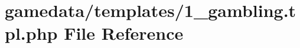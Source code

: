 \hypertarget{1__gambling_8tpl_8php}{\section{gamedata/templates/1\+\_\+gambling.tpl.\+php File Reference}
\label{1__gambling_8tpl_8php}
}

